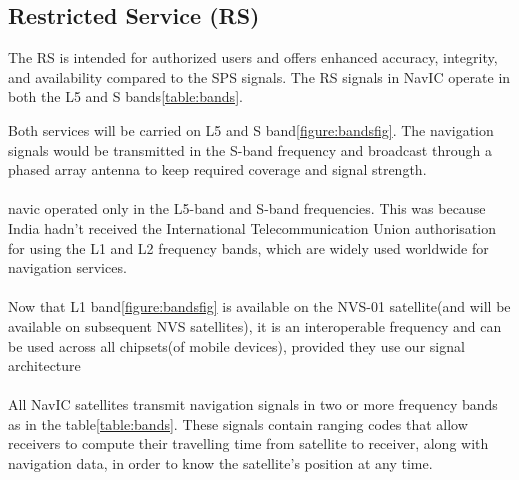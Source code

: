 \subsection{Restricted Service (RS)}
The RS is intended for authorized users and offers enhanced accuracy, integrity, and availability compared to the SPS signals. The RS signals in NavIC operate in both the L5 and S bands\ref{table:bands}.	

	
Both services will be carried on L5 and S band\ref{figure:bandsfig}. The navigation signals would be transmitted in the S-band frequency and broadcast through a phased array antenna to keep required coverage and signal strength.
\\
\\
navic operated only in the L5-band and S-band frequencies. This was because India hadn't received the International Telecommunication Union authorisation for using the L1 and L2 frequency bands, which are widely used worldwide for navigation services.
\\
\\
Now that L1 band\ref{figure:bandsfig} is available on the NVS-01 satellite(and will be available on subsequent NVS satellites), it is an interoperable frequency and can be used across all chipsets(of mobile devices), provided they use our signal architecture
\\
\\
All NavIC satellites transmit navigation signals in two or more frequency bands as in the table\ref{table:bands}. These signals contain ranging codes that allow receivers to compute their travelling time from satellite to receiver, along with navigation data, in order to know the satellite’s position at any time. 
%
